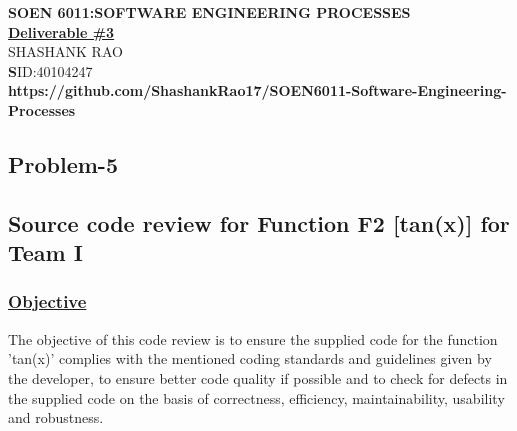 \documentclass[12pt]{report}
\begin{document}
\begin{center}
	\large\textbf{SOEN 6011:SOFTWARE ENGINEERING PROCESSES}\\
	\vspace{0.05cm}\large\textbf{\underline{Deliverable \#3}}\\
	\vspace{0.05cm}\small{SHASHANK RAO}\\
	\small\textbf SID:40104247\\

	\vspace{0.10cm}\small\textbf{https://github.com/ShashankRao17/SOEN6011-Software-Engineering-Processes}
	
\end{center}

\renewcommand \thesection{\arabic{section}}
\renewcommand \thesubsection{\arabic{section}.\arabic{subsection}}

\begin{center}
	\section{Problem-5}
\end{center}

\subsection{Source code review for Function F2 [tan(x)] for Team I}
	\subsubsection{\underline{Objective}}The objective of this code review is to ensure the supplied code for the function 'tan(x)' complies with the mentioned coding standards and guidelines given by the developer, to ensure better code quality if possible and to check for defects in the supplied code on the basis of correctness, efficiency, maintainability, usability and robustness.
\end{document}

